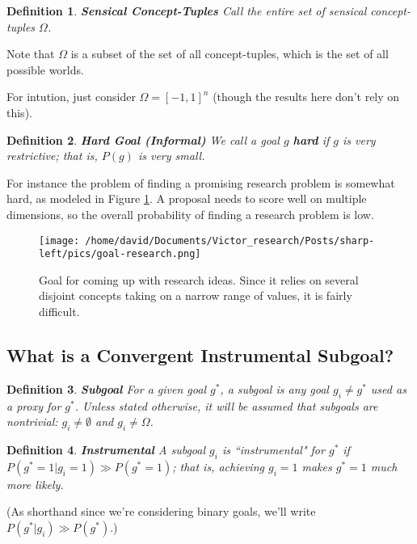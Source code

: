 \documentclass{article}
\newtheorem{definition}{Definition}
\begin{document}
\begin{definition}{\textbf{Sensical Concept-Tuples}}
    Call the entire set of sensical concept-tuples $\Omega$.
\end{definition}

Note that $\Omega$ is a subset of the set of all concept-tuples, which is the set of all possible worlds.


For intution, just consider $\Omega=[-1,1]^n$ (though the results here don't rely on this).

\begin{definition}{\textbf{Hard Goal (Informal)}}
    We call a goal $g$ \textbf{hard} if $g$ is very restrictive; that is, $P(g)$ is very small.
\end{definition}

For instance the problem of finding a promising research problem is somewhat hard, as modeled in Figure \ref{fig:goal-research}. A proposal needs to score well on multiple dimensions, so the overall probability of finding a research problem is low.

\begin{figure}[ht]
    \centering
    \texttt{[image: /home/david/Documents/Victor\_research/Posts/sharp-left/pics/goal-research.png]} 
    \caption{Goal for coming up with research ideas. Since it relies on several disjoint concepts taking on a narrow range of values, it is fairly difficult.}
    \label{fig:goal-research} 
\end{figure}

\subsection{What is a Convergent Instrumental Subgoal?}

\begin{definition}{\textbf{Subgoal}}
    For a given goal $g^*$, a subgoal is any goal $g_i \neq g^*$ used as a proxy for $g^*$. Unless stated otherwise, it will be assumed that subgoals are nontrivial: $g_i \neq \emptyset$ and $g_i \neq \Omega$.
\end{definition}

\begin{definition}{\textbf{Instrumental}}
    A subgoal $g_i$ is ``instrumental" for $g^*$ if $P(g^*=1|g_i=1)\gg P(g^*=1)$; that is, achieving $g_i=1$ makes $g^*=1$ much more likely.
\end{definition}

(As shorthand since we're considering binary goals, we'll write $P(g^*|g_i)\gg P(g^*)$.)
\end{document}

